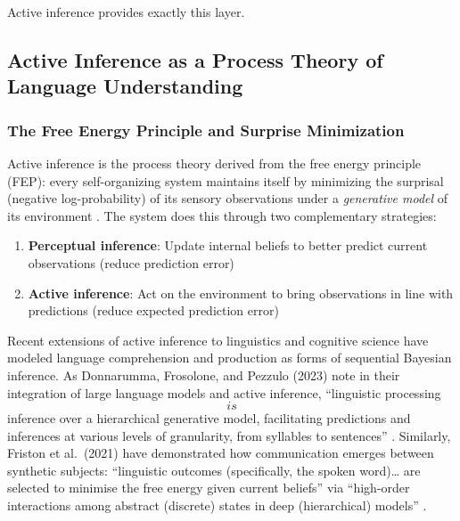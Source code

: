 \documentclass[
]{article}
\providecommand{\tightlist}{%
  \setlength{\itemsep}{0pt}\setlength{\parskip}{0pt}}
\numberwithin{equation}{section}
\begin{document}
Active inference \citep{friston2017active} provides exactly this layer.

\subsection{Active Inference as a Process Theory of Language
Understanding}\label{active-inference-as-a-process-theory-of-language-understanding}

\subsubsection{The Free Energy Principle and Surprise
Minimization}\label{the-free-energy-principle-and-surprise-minimization}

Active inference is the process theory derived from the free energy
principle (FEP): every self-organizing system maintains itself by
minimizing the surprisal (negative log-probability) of its sensory
observations under a \emph{generative model} of its environment
\citeyearpar{friston2010free}. The system does this through two
complementary strategies:

\begin{enumerate}
\def\labelenumi{\arabic{enumi}.}
\tightlist
\item
  \textbf{Perceptual inference}: Update internal beliefs to better
  predict current observations (reduce prediction error)
\item
  \textbf{Active inference}: Act on the environment to bring
  observations in line with predictions (reduce expected prediction
  error)
\end{enumerate}

Recent extensions of active inference to linguistics and cognitive
science have modeled language comprehension and production as forms of
sequential Bayesian inference. As Donnarumma, Frosolone, and Pezzulo
(2023) note in their integration of large language models and active
inference, ``linguistic processing \[is\] inference over a
hierarchical generative model, facilitating predictions and inferences
at various levels of granularity, from syllables to sentences''
\citeyearpar{donnarumma2023integrating}. Similarly, Friston et
al.~(2021) have demonstrated how communication emerges between synthetic
subjects: ``linguistic outcomes (specifically, the spoken word)\ldots{}
are selected to minimise the free energy given current beliefs'' via
``high-order interactions among abstract (discrete) states in deep
(hierarchical) models''
\citetext{\citeyear{friston2021understanding}; \citeyear{friston2020generative}}.
\end{document}

